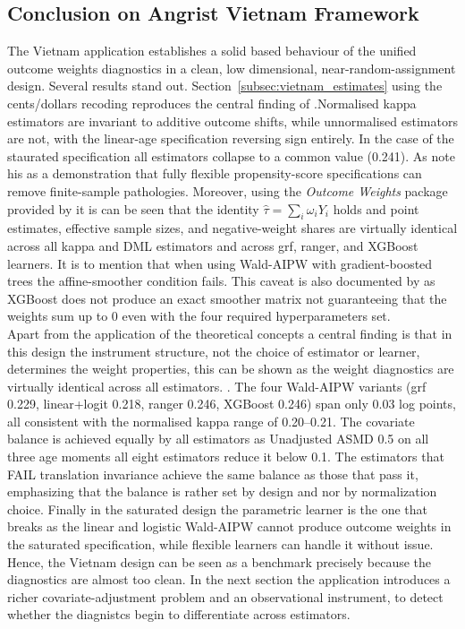 \documentclass[12pt, a4paper, oneside]{article}
\theoremstyle{plain}
\theoremstyle{definition}
\begin{document}
\subsection{Conclusion on Angrist Vietnam Framework}
\label{subsec:vietnam_summary}
The Vietnam application establishes a solid based behaviour of the unified outcome weights diagnostics in a clean, low dimensional, near-random-assignment design.
Several results stand out. Section~\ref{subsec:vietnam_estimates} using the cents/dollars recoding reproduces
the central finding of \citet{sloczynski2025abadie}.Normalised kappa
estimators are invariant to additive outcome shifts, while unnormalised
estimators are not, with the linear-age specification reversing sign entirely. In the case of the staurated specification all estimators collapse to a common value (0.241). As \citet{sloczynski2025abadie} note his as a demonstration that fully flexible
propensity-score specifications can remove finite-sample pathologies.
Moreover, using the \textit{Outcome Weights} package provided by \citet{knaus2024treatment} it is can be seen that the identity \(\hat\tau=\sum_i\omega_iY_i\) holds and  point estimates,
effective sample sizes, and negative-weight shares are virtually identical
across all kappa and DML estimators and across grf, ranger, and XGBoost
learners. It is to mention that when using Wald-AIPW with gradient-boosted trees the affine-smoother condition fails. This caveat is also documented by \citet{knaus2024treatment} as XGBoost does not produce an exact smoother matrix not guaranteeing that the weights sum up to 0 even with the four required hyperparameters set. \\
Apart from the application of the theoretical concepts a central finding is that in this design the instrument structure, not the choice of estimator
or learner, determines the weight properties, this can be shown as the weight diagnostics are virtually identical across all estimators.
. The four
Wald-AIPW variants (grf 0.229, linear+logit 0.218, ranger 0.246,
XGBoost 0.246) span only 0.03 log points, all consistent with the
normalised kappa range of 0.20–0.21.
The covariate balance is achieved equally by all estimators as Unadjusted
ASMD 0.5 on all three age moments all eight estimators reduce it below
0.1. The estimators that FAIL translation invariance achieve the same
balance as those that pass it, emphasizing that the balance is rather set by design and nor by normalization choice. 
Finally in the saturated design the parametric learner is the one that breaks  as the linear and logistic Wald-AIPW cannot produce outcome weights
in the saturated specification, while flexible learners can handle it without issue.
Hence, the Vietnam design can be seen as a benchmark precisely
because the diagnostics are almost too clean. 
In the next section the \citet{card1993using} application introduces a richer covariate-adjustment problem and an observational instrument, to detect whether the diagnistcs begin to differentiate across estimators.
\end{document}

